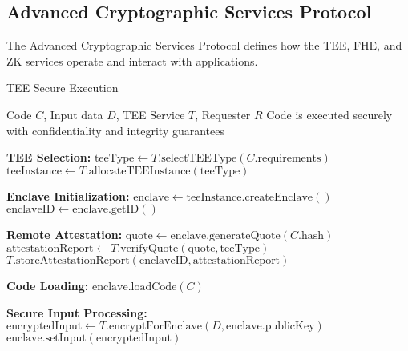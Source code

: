 \subsection{Advanced Cryptographic Services Protocol}
\label{subsec:advanced-crypto-protocol}

The Advanced Cryptographic Services Protocol defines how the TEE, FHE, and ZK services operate and interact with applications.

\begin{tcolorbox}[
    enhanced,
    colback=blue!5!white,
    colframe=blue!75!black,
    arc=5mm,
    boxrule=1.5pt,
    title=Advanced Crypto Protocol,
    fonttitle=\bfseries,
    coltitle=white,
    attach boxed title to top left={yshift=-2mm, xshift=5mm},
    boxed title style={colback=blue!75!black, rounded corners},
    shadow={2mm}{-2mm}{0mm}{black!50},
    drop fuzzy shadow
]
\begin{tcolorbox}[
    enhanced,
    colback=blue!5!white,
    colframe=blue!75!black,
    arc=5mm,
    boxrule=1.5pt,
    title=Protocol,
    fonttitle=\bfseries,
    coltitle=white,
    attach boxed title to top left={yshift=-2mm, xshift=5mm},
    boxed title style={colback=blue!75!black, rounded corners},
    shadow={2mm}{-2mm}{0mm}{black!50},
    drop fuzzy shadow
]
\begin{protocol}{TEE Secure Execution}
\label{prot:tee-execution}
\begin{algorithmic}[1]
\Require Code $C$, Input data $D$, TEE Service $T$, Requester $R$
\Ensure Code is executed securely with confidentiality and integrity guarantees

\State \textbf{TEE Selection:}
\State $\text{teeType} \gets T.\text{selectTEEType}(C.\text{requirements})$
\State $\text{teeInstance} \gets T.\text{allocateTEEInstance}(\text{teeType})$

\State \textbf{Enclave Initialization:}
\State $\text{enclave} \gets \text{teeInstance}.\text{createEnclave}()$
\State $\text{enclaveID} \gets \text{enclave}.\text{getID}()$

\State \textbf{Remote Attestation:}
\State $\text{quote} \gets \text{enclave}.\text{generateQuote}(C.\text{hash})$
\State $\text{attestationReport} \gets T.\text{verifyQuote}(\text{quote}, \text{teeType})$
\State $T.\text{storeAttestationReport}(\text{enclaveID}, \text{attestationReport})$

\State \textbf{Code Loading:}
\State $\text{enclave}.\text{loadCode}(C)$

\State \textbf{Secure Input Processing:}
\State $\text{encryptedInput} \gets T.\text{encryptForEnclave}(D, \text{enclave}.\text{publicKey})$
\State $\text{enclave}.\text{setInput}(\text{encryptedInput})$


\end{algorithmic}
\end{protocol}
\end{tcolorbox}
\end{tcolorbox}
